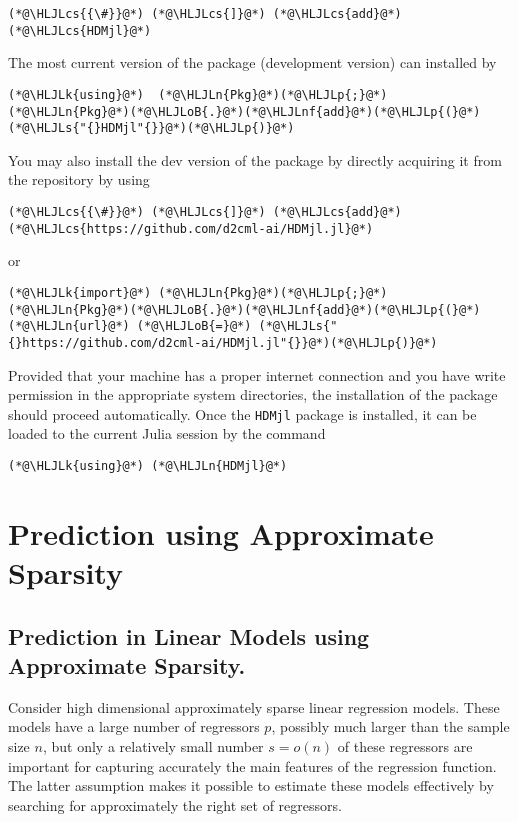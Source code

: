 \documentclass[12pt,a4paper]{article}
\newcommand{\HLJLk}[1]{\textcolor[RGB]{148,91,176}{\textbf{#1}}}
\newcommand{\HLJLn}[1]{#1}
\newcommand{\HLJLnf}[1]{\textcolor[RGB]{66,102,213}{#1}}
\newcommand{\HLJLs}[1]{\textcolor[RGB]{201,61,57}{#1}}
\newcommand{\HLJLoB}[1]{\textcolor[RGB]{102,102,102}{\textbf{#1}}}
\newcommand{\HLJLp}[1]{#1}
\newcommand{\HLJLcs}[1]{\textcolor[RGB]{153,153,119}{\textit{#1}}}
\begin{document}
\begin{lstlisting}
(*@\HLJLcs{{\#}}@*) (*@\HLJLcs{]}@*) (*@\HLJLcs{add}@*) (*@\HLJLcs{HDMjl}@*)
\end{lstlisting}

The most current version of the package (development version) can installed by


\begin{lstlisting}
(*@\HLJLk{using}@*)  (*@\HLJLn{Pkg}@*)(*@\HLJLp{;}@*) (*@\HLJLn{Pkg}@*)(*@\HLJLoB{.}@*)(*@\HLJLnf{add}@*)(*@\HLJLp{(}@*)(*@\HLJLs{"{}HDMjl"{}}@*)(*@\HLJLp{)}@*)
\end{lstlisting}

You may also install the dev version of the package by directly acquiring it from the repository by using


\begin{lstlisting}
(*@\HLJLcs{{\#}}@*) (*@\HLJLcs{]}@*) (*@\HLJLcs{add}@*) (*@\HLJLcs{https://github.com/d2cml-ai/HDMjl.jl}@*)
\end{lstlisting}

or 


\begin{lstlisting}
(*@\HLJLk{import}@*) (*@\HLJLn{Pkg}@*)(*@\HLJLp{;}@*) (*@\HLJLn{Pkg}@*)(*@\HLJLoB{.}@*)(*@\HLJLnf{add}@*)(*@\HLJLp{(}@*)(*@\HLJLn{url}@*) (*@\HLJLoB{=}@*) (*@\HLJLs{"{}https://github.com/d2cml-ai/HDMjl.jl"{}}@*)(*@\HLJLp{)}@*)
\end{lstlisting}

Provided that your machine has a proper internet connection and you have write permission in the appropriate system directories, the installation of the package should proceed automatically. Once the \texttt{HDMjl} package is installed, it can be loaded to the current Julia session by the command


\begin{lstlisting}
(*@\HLJLk{using}@*) (*@\HLJLn{HDMjl}@*)
\end{lstlisting}


\section{Prediction using Approximate Sparsity}
\subsection{Prediction in Linear Models using Approximate Sparsity.}
Consider high dimensional approximately sparse linear regression models. These models have a large number of regressors $p$, possibly much larger than the sample size $n$, but only a relatively small number $s = o(n)$ of these regressors are important for capturing accurately the main features of the regression function. The latter assumption makes it possible to estimate these models effectively by searching for approximately the right set of regressors.
\end{document}
